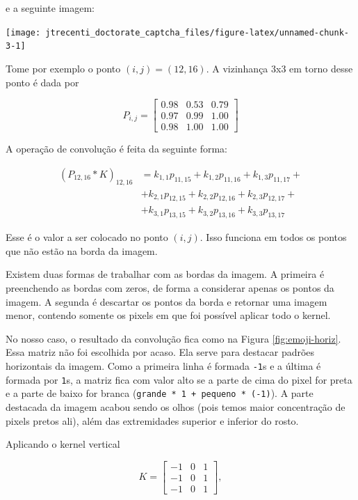 \documentclass[12pt,]{report}
\begin{document}
e a seguinte imagem:

\begin{center}\texttt{[image: jtrecenti\_doctorate\_captcha\_files/figure-latex/unnamed-chunk-3-1]} \end{center}

Tome por exemplo o ponto \((i,j) = (12,16)\). A vizinhança 3x3 em torno desse ponto é dada por

\[
P_{i,j} = \left[\begin{array}{rrr}
0.98 & 0.53 & 0.79 \\ 
0.97 & 0.99 & 1.00 \\ 
0.98 & 1.00 & 1.00 
\end{array}\right]
\]

A operação de convolução é feita da seguinte forma:

\[
\begin{aligned}
(P_{12,16} *K )_{12,16}
&= k_{1,1}p_{11,15} + k_{1,2}p_{11,16} + k_{1,3}p_{11,17} + \\
&+ k_{2,1}p_{12,15} + k_{2,2}p_{12,16} + k_{2,3}p_{12,17} + \\
&+ k_{3,1}p_{13,15} + k_{3,2}p_{13,16} + k_{3,3}p_{13,17}
\end{aligned}
\]

Esse é o valor a ser colocado no ponto \((i,j)\). Isso funciona em todos os pontos que não estão na borda da imagem.

Existem duas formas de trabalhar com as bordas da imagem. A primeira é preenchendo as bordas com zeros, de forma a considerar apenas os pontos da imagem. A segunda é descartar os pontos da borda e retornar uma imagem menor, contendo somente os pixels em que foi possível aplicar todo o kernel.

No nosso caso, o resultado da convolução fica como na Figura \ref{fig:emoji-horiz}. Essa matriz não foi escolhida por acaso. Ela serve para destacar padrões horizontais da imagem. Como a primeira linha é formada \texttt{-1}s e a última é formada por \texttt{1}s, a matriz fica com valor alto se a parte de cima do pixel for preta e a parte de baixo for branca (\texttt{grande\ *\ 1\ +\ pequeno\ *\ (-1)}). A parte destacada da imagem acabou sendo os olhos (pois temos maior concentração de pixels pretos ali), além das extremidades superior e inferior do rosto.

Aplicando o kernel vertical

\[
K = \left[\begin{array}{rrr}-1&0&1\\-1&0&1\\-1&0&1\end{array}\right],
\]
\end{document}
